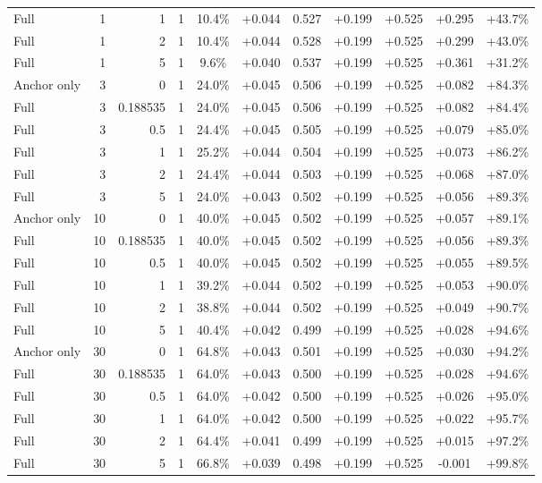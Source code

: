 \begin{table}[htbp]
\begin{tabular}{lrrrccccccc}
Full & 1 & 1 & 1 & 10.4\% & +0.044 & 0.527 & +0.199 & +0.525 & +0.295 & +43.7\% \\
Full & 1 & 2 & 1 & 10.4\% & +0.044 & 0.528 & +0.199 & +0.525 & +0.299 & +43.0\% \\
Full & 1 & 5 & 1 & 9.6\% & +0.040 & 0.537 & +0.199 & +0.525 & +0.361 & +31.2\% \\
Anchor only & 3 & 0 & 1 & 24.0\% & +0.045 & 0.506 & +0.199 & +0.525 & +0.082 & +84.3\% \\
Full & 3 & 0.188535 & 1 & 24.0\% & +0.045 & 0.506 & +0.199 & +0.525 & +0.082 & +84.4\% \\
Full & 3 & 0.5 & 1 & 24.4\% & +0.045 & 0.505 & +0.199 & +0.525 & +0.079 & +85.0\% \\
Full & 3 & 1 & 1 & 25.2\% & +0.044 & 0.504 & +0.199 & +0.525 & +0.073 & +86.2\% \\
Full & 3 & 2 & 1 & 24.4\% & +0.044 & 0.503 & +0.199 & +0.525 & +0.068 & +87.0\% \\
Full & 3 & 5 & 1 & 24.0\% & +0.043 & 0.502 & +0.199 & +0.525 & +0.056 & +89.3\% \\
Anchor only & 10 & 0 & 1 & 40.0\% & +0.045 & 0.502 & +0.199 & +0.525 & +0.057 & +89.1\% \\
Full & 10 & 0.188535 & 1 & 40.0\% & +0.045 & 0.502 & +0.199 & +0.525 & +0.056 & +89.3\% \\
Full & 10 & 0.5 & 1 & 40.0\% & +0.045 & 0.502 & +0.199 & +0.525 & +0.055 & +89.5\% \\
Full & 10 & 1 & 1 & 39.2\% & +0.044 & 0.502 & +0.199 & +0.525 & +0.053 & +90.0\% \\
Full & 10 & 2 & 1 & 38.8\% & +0.044 & 0.502 & +0.199 & +0.525 & +0.049 & +90.7\% \\
Full & 10 & 5 & 1 & 40.4\% & +0.042 & 0.499 & +0.199 & +0.525 & +0.028 & +94.6\% \\
Anchor only & 30 & 0 & 1 & 64.8\% & +0.043 & 0.501 & +0.199 & +0.525 & +0.030 & +94.2\% \\
Full & 30 & 0.188535 & 1 & 64.0\% & +0.043 & 0.500 & +0.199 & +0.525 & +0.028 & +94.6\% \\
Full & 30 & 0.5 & 1 & 64.0\% & +0.042 & 0.500 & +0.199 & +0.525 & +0.026 & +95.0\% \\
Full & 30 & 1 & 1 & 64.0\% & +0.042 & 0.500 & +0.199 & +0.525 & +0.022 & +95.7\% \\
Full & 30 & 2 & 1 & 64.4\% & +0.041 & 0.499 & +0.199 & +0.525 & +0.015 & +97.2\% \\
Full & 30 & 5 & 1 & 66.8\% & +0.039 & 0.498 & +0.199 & +0.525 & -0.001 & +99.8\% \\

\end{tabular}
\end{table}
